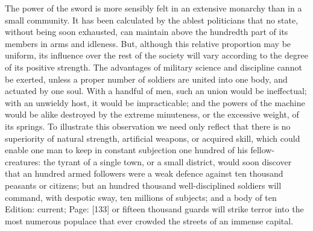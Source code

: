 The power of the sword is more sensibly felt in an extensive monarchy than in a small community. It has been calculated by the ablest politicians that no state, without being soon exhausted, can maintain above the hundredth part of its members in arms and idleness. But, although this relative proportion may be uniform, its influence over the rest of the society will vary according to the degree of its positive strength. The advantages of military science and discipline cannot be exerted, unless a proper number of soldiers are united into one body, and actuated by one soul. With a handful of men, such an union would be ineffectual; with an unwieldy host, it would be impracticable; and the powers of the machine would be alike destroyed by the extreme minuteness, or the excessive weight, of its springs. To illustrate this observation we need only reflect that there is no superiority of natural strength, artificial weapons, or acquired skill, which could enable one man to keep in constant subjection one hundred of his fellow-creatures: the tyrant of a single town, or a small district, would soon discover that an hundred armed followers were a weak defence against ten thousand peasants or citizens; but an hundred thousand well-disciplined soldiers will command, with despotic sway, ten millions of subjects; and a body of ten Edition: current; Page: [133] or fifteen thousand guards will strike terror into the most numerous populace that ever crowded the streets of an immense capital.

